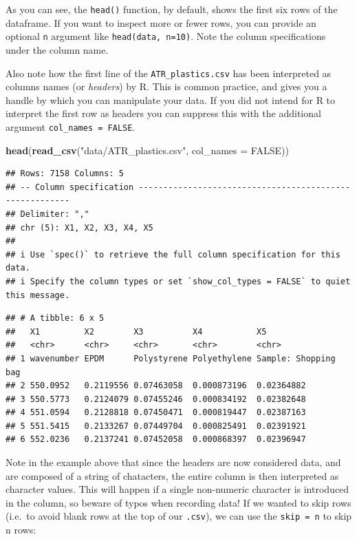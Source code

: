 \documentclass[
]{book}
\newenvironment{Shaded}{\begin{snugshade}}{\end{snugshade}}
\newcommand{\AttributeTok}[1]{\textcolor[rgb]{0.13,0.29,0.53}{#1}}
\newcommand{\ConstantTok}[1]{\textcolor[rgb]{0.56,0.35,0.01}{#1}}
\newcommand{\FunctionTok}[1]{\textcolor[rgb]{0.13,0.29,0.53}{\textbf{#1}}}
\newcommand{\NormalTok}[1]{#1}
\newcommand{\StringTok}[1]{\textcolor[rgb]{0.31,0.60,0.02}{#1}}
\begin{document}
As you can see, the \texttt{head()} function, by default, shows the first six rows of the dataframe. If you want to inspect more or fewer rows, you can provide an optional \texttt{n} argument like \texttt{head(data,\ n=10)}. Note the column specifications under the column name.

Also note how the first line of the \texttt{ATR\_plastics.csv} has been interpreted as columns names (or \emph{headers}) by R. This is common practice, and gives you a handle by which you can manipulate your data. If you did not intend for R to interpret the first row as headers you can suppress this with the additional argument \texttt{col\_names\ =\ FALSE}.

\begin{Shaded}
\begin{Highlighting}[]
\FunctionTok{head}\NormalTok{(}\FunctionTok{read\_csv}\NormalTok{(}\StringTok{"data/ATR\_plastics.csv"}\NormalTok{, }\AttributeTok{col\_names =} \ConstantTok{FALSE}\NormalTok{))}
\end{Highlighting}
\end{Shaded}

\begin{verbatim}
## Rows: 7158 Columns: 5
## -- Column specification --------------------------------------------------------
## Delimiter: ","
## chr (5): X1, X2, X3, X4, X5
## 
## i Use `spec()` to retrieve the full column specification for this data.
## i Specify the column types or set `show_col_types = FALSE` to quiet this message.
\end{verbatim}

\begin{verbatim}
## # A tibble: 6 x 5
##   X1         X2        X3          X4           X5                  
##   <chr>      <chr>     <chr>       <chr>        <chr>               
## 1 wavenumber EPDM      Polystyrene Polyethylene Sample: Shopping bag
## 2 550.0952   0.2119556 0.07463058  0.000873196  0.02364882          
## 3 550.5773   0.2124079 0.07455246  0.000834192  0.02382648          
## 4 551.0594   0.2128818 0.07450471  0.000819447  0.02387163          
## 5 551.5415   0.2133267 0.07449704  0.000825491  0.02391921          
## 6 552.0236   0.2137241 0.07452058  0.000868397  0.02396947
\end{verbatim}

Note in the example above that since the headers are now considered data, and are composed of a string of chatacters, the entire column is then interpreted as character values. This will happen if a single non-numeric character is introduced in the column, so beware of typos when recording data! If we wanted to skip rows (i.e.~to avoid blank rows at the top of our \texttt{.csv}), we can use the \texttt{skip\ =\ n} to skip n rows:
\end{document}
